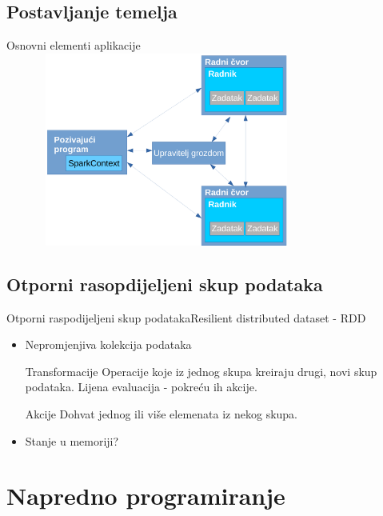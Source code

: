 \documentclass{beamer}
\begin{document}
\subsection{Postavljanje temelja}

\begin{frame}{Osnovni elementi aplikacije}
	\includegraphics[width=300pt, height=180pt]{elementiAplikacijeCropped.pdf}%
\end{frame}

\subsection{Otporni rasopdijeljeni skup podataka}

\begin{frame}{Otporni raspodijeljeni skup podataka}{Resilient distributed dataset - RDD}
  \begin{itemize}
  \item {
 	Nepromjenjiva kolekcija podataka
 	\pause
  }
  
  \begin{block}{Transformacije}
	Operacije koje iz jednog skupa kreiraju drugi, novi skup podataka.
	\alert{Lijena evaluacija} - pokreću ih akcije.
	\end{block}  
	
  \pause
  \begin{block}{Akcije}
	Dohvat jednog ili više elemenata iz nekog skupa. 
  \end{block}
  \pause  
  
  \item {
 	Stanje u memoriji?
  }
  \end{itemize}
\end{frame}

\section{Napredno programiranje}
\end{document}
